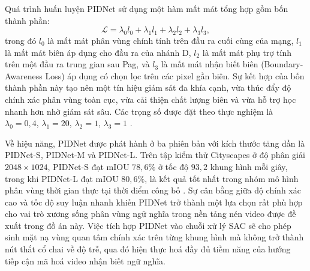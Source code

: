 Quá trình huấn luyện PIDNet sử dụng một hàm mất mát tổng hợp gồm bốn thành phần:
\begin{equation}
  \mathcal{L} = \lambda_0 l_0 + \lambda_1 l_1 + \lambda_2 l_2 + \lambda_3 l_3,
\end{equation}
trong đó $l_0$ là mất mát phân vùng chính tính trên đầu ra cuối cùng của mạng, $l_1$ là mất mát biên áp dụng cho đầu ra của nhánh D, $l_2$ là mất mát phụ trợ tính trên một đầu ra trung gian sau Pag, và $l_3$ là mất mát nhận biết biên (Boundary-Awareness Loss) áp dụng có chọn lọc trên các pixel gần biên. Sự kết hợp của bốn thành phần này tạo nên một tín hiệu giám sát đa khía cạnh, vừa thúc đẩy độ chính xác phân vùng toàn cục, vừa cải thiện chất lượng biên và vừa hỗ trợ học nhanh hơn nhờ giám sát sâu. Các trọng số được đặt theo thực nghiệm là $\lambda_0 = 0{,}4$, $\lambda_1 = 20$, $\lambda_2 = 1$, $\lambda_3 = 1$ \cite{PID}.

Về hiệu năng, PIDNet được phát hành ở ba phiên bản với kích thước tăng dần là PIDNet-S, PIDNet-M và PIDNet-L. Trên tập kiểm thử Cityscapes ở độ phân giải $2048 \times 1024$, PIDNet-S đạt mIOU $78{,}6\%$ ở tốc độ $93{,}2$ khung hình mỗi giây, trong khi PIDNet-L đạt mIOU $80{,}6\%$, là kết quả tốt nhất trong nhóm mô hình phân vùng thời gian thực tại thời điểm công bố \cite{PID}. Sự cân bằng giữa độ chính xác cao và tốc độ suy luận nhanh khiến PIDNet trở thành một lựa chọn rất phù hợp cho vai trò xương sống phân vùng ngữ nghĩa trong nền tảng nén video được đề xuất trong đồ án này. Việc tích hợp PIDNet vào chuỗi xử lý SAC sẽ cho phép sinh mặt nạ vùng quan tâm chính xác trên từng khung hình mà không trở thành nút thắt cổ chai về độ trễ, qua đó hiện thực hoá đầy đủ tiềm năng của hướng tiếp cận mã hoá video nhận biết ngữ nghĩa.
